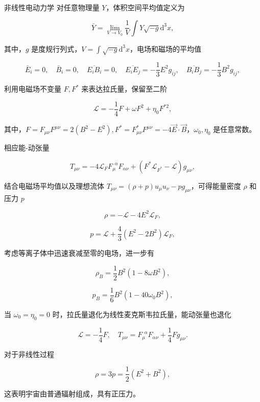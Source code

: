 \documentclass[9pt, dvipsnames]{beamer} %
\begin{document}
\begin{frame}{非线性电动力学}
    对任意物理量 $Y$，体积空间平均值定义为

    $$
    \bar{Y}
    =\lim_{V\to V_0} \frac{1 }{V } \int Y\sqrt{-g} \mathrm{d}^3 x,
    $$

    其中，$g$ 是度规行列式，$\displaystyle{V=\int\sqrt{-g}\mathrm{d}^3 x } $，电场和磁场的平均值

    $$
    \bar{E}_i = 0,\quad
    \bar{B}_i = 0,\quad
    \overline{E_i B_i} = 0,\quad
    \overline{E_i E_j} = -\frac{1 }{3 } E^2 g_{ij},\quad
    \overline{B_i B_j} = -\frac{1 }{3 } B^2 g_{ij},
    $$

    利用电磁场不变量 $F,F^*$ 来表达拉氏量，保留至二阶

    $$
    \mathcal{L}=-\frac{1 }{4 } F + \omega F^2 + \eta_0 F^{*2},
    $$

    其中，$F=F_{\mu\nu} F^{\mu\nu}=2(B^2-E^2),F^*=F_{\mu\nu}^*F^{\mu\nu}=-4\vec{E}\cdot\vec{B}$，$\omega_0,\eta_0$ 是任意常数。

    相应能-动张量

    $$
    T_{\mu\nu}
    =-4\mathcal{L}_F F_\mu^{~~\alpha} F_{\alpha\nu} + \left(F^* \mathcal{L}_{F^*} - \mathcal{L} \right) g_{\mu\nu},
    $$

\end{frame}

\begin{frame}
    结合电磁场平均值以及理想流体 $T_{\mu\nu}=(\rho+p)u_\mu u_\nu-p g_{\mu\nu}$，可得能量密度 $\rho$ 和压力 $p$

    $$
    \rho = -\mathcal{L} - 4E^2 \mathcal{L}_F,
    $$

    $$
    p = \mathcal{L} + \frac{4 }{3 } \left(E^2-2B^2 \right)\mathcal{L}_F,
    $$

    考虑等离子体中迅速衰减至零的电场，进一步有

    $$
    \rho_B = \frac{1 }{2 } B^2\left(1-8\omega B^2 \right),
    $$


    $$
    p_B = \frac{1 }{6 } B^2 \left(1-40\omega_0 B^2 \right),
    $$

    当 $\omega_0=\eta_0=0$ 时，拉氏量退化为线性麦克斯韦拉氏量，能动张量也退化

    $$
    \mathcal{L} = -\frac{1 }{4 } F,\quad
    T_{\mu\nu} = F_\mu^{~~\alpha} F_{\alpha\nu} + \frac{1 }{4 } F g_{\mu\nu}.
    $$

    对于非线性过程

    $$
    \rho = 3p = \frac{1 }{2 } \left(E^2 + B^2 \right),
    $$

    这表明宇宙由普通辐射组成，具有正压力。

\end{frame}
\end{document}
